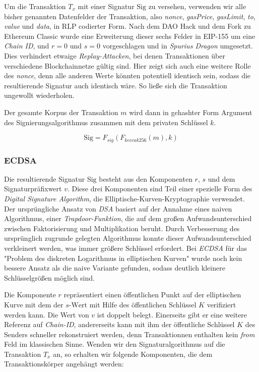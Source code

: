 \documentclass[runningheads]{llncs}
\begin{document}
Um die Transaktion $ T_x $ mit einer Signatur $ \text{Sig} $ zu versehen, verwenden wir alle bisher genannten Datenfelder der Transaktion, also \textit{nonce}, \textit{gasPrice}, \textit{gasLimit}, \textit{to}, \textit{value} und \textit{data}, in RLP codierter Form. Nach dem DAO Hack und dem Fork zu Ethereum Classic wurde eine Erweiterung dieser sechs Felder in EIP-155 \cite{noauthor_ethereum/eips_nodate} um eine \textit{Chain ID}, und $ r = 0 $ und $ s = 0 $ vorgeschlagen und in \textit{Spurius Dragon} umgesetzt. Dies verhindert etwaige \textit{Replay-Attacken}, bei denen Transaktionen über verschiedene Blockchainnetze gültig sind. \cite[S. 138]{iyer_cryptoeconomics_2018} Hier zeigt sich auch eine weitere Rolle des \textit{nonce}, denn alle anderen Werte könnten potentiell identisch sein, sodass die resultierende Signatur auch identisch wäre. So ließe sich die Transaktion ungewollt wiederholen.

Der gesamte Korpus der Transaktion $ m $ wird dann in gehashter Form Argument des Signierungsalgorithmus zusammen mit dem privaten Schlüssel $ k $.

$$
  \text{Sig} = F_{sig}(F_{keccak256}(m), k)
$$

\subsubsection{ECDSA}
\label{ecdsa}
Die resultierende Signatur $ \text{Sig} $ besteht aus den Komponenten $ r $, $ s $ und dem Signaturpräfixwert $ v $.  Diese drei Komponenten sind Teil einer spezielle Form des \textit{Digital Signature Algorithm}, die Elliptische-Kurven-Kryptographie verwendet. Der ursprüngliche Ansatz von \textit{DSA} basiert auf der Annahme eines naiven Algorithmus, einer \textit{Trapdoor-Funktion}, die auf dem großen Aufwandsunterschied zwischen Faktorisierung und Multiplikation beruht. Durch Verbesserung des ursprünglich zugrunde gelegten Algorithmus konnte dieser Aufwandsunterschied verkleinert werden, was immer größere Schlüssel erfordert. Bei \textit{ECDSA} für das "Problem des diskreten Logarithmus in elliptischen Kurven" wurde noch kein bessere Ansatz als die naive Variante gefunden, sodass deutlich kleinere Schlüsselgrößen möglich sind.

Die Komponente $ r $ repräsentiert einen öffentlichen Punkt auf der elliptischen Kurve mit dem der $ s\text{-Wert} $ mit Hilfe des öffentlichen Schlüssel $ K $ verifiziert werden kann. Die Wert von $ v $ ist doppelt belegt. Einerseits gibt er eine weitere Referenz auf \textit{Chain-ID}, andererseits kann mit ihm der öffentliche Schlüssel $ K $ des Senders schneller rekonstruiert werden, denn Transaktionnen enthalten kein \textit{from} Feld im klassischen Sinne. Wenden wir den Signaturalgorithmus auf die Transaktion $ T_x $ an, so erhalten wir folgende Komponenten, die dem Transaktionskörper angehängt werden: \cite[S. 114 ff.]{antonopoulos_mastering_2019}
\end{document}
